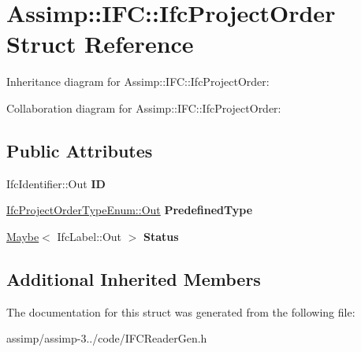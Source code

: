 \hypertarget{struct_assimp_1_1_i_f_c_1_1_ifc_project_order}{\section{Assimp\+:\+:I\+F\+C\+:\+:Ifc\+Project\+Order Struct Reference}
\label{struct_assimp_1_1_i_f_c_1_1_ifc_project_order}
}


Inheritance diagram for Assimp\+:\+:I\+F\+C\+:\+:Ifc\+Project\+Order\+:


Collaboration diagram for Assimp\+:\+:I\+F\+C\+:\+:Ifc\+Project\+Order\+:
\subsection*{Public Attributes}
\begin{DoxyCompactItemize}
\item 
\hypertarget{struct_assimp_1_1_i_f_c_1_1_ifc_project_order_a8e60f716dfee75e9306ff1666c45c30f}{Ifc\+Identifier\+::\+Out {\bfseries I\+D}}\label{struct_assimp_1_1_i_f_c_1_1_ifc_project_order_a8e60f716dfee75e9306ff1666c45c30f}

\item 
\hypertarget{struct_assimp_1_1_i_f_c_1_1_ifc_project_order_acf1330416571ff9c24ee4b069d605dd9}{\hyperlink{classboost_1_1shared__ptr}{Ifc\+Project\+Order\+Type\+Enum\+::\+Out} {\bfseries Predefined\+Type}}\label{struct_assimp_1_1_i_f_c_1_1_ifc_project_order_acf1330416571ff9c24ee4b069d605dd9}

\item 
\hypertarget{struct_assimp_1_1_i_f_c_1_1_ifc_project_order_ad4731f92ee6eb9a05cdb7d5437950ade}{\hyperlink{struct_assimp_1_1_s_t_e_p_1_1_maybe}{Maybe}$<$ Ifc\+Label\+::\+Out $>$ {\bfseries Status}}\label{struct_assimp_1_1_i_f_c_1_1_ifc_project_order_ad4731f92ee6eb9a05cdb7d5437950ade}

\end{DoxyCompactItemize}
\subsection*{Additional Inherited Members}


The documentation for this struct was generated from the following file\+:\begin{DoxyCompactItemize}
\item 
assimp/assimp-\/3../code/I\+F\+C\+Reader\+Gen.\+h\end{DoxyCompactItemize}
